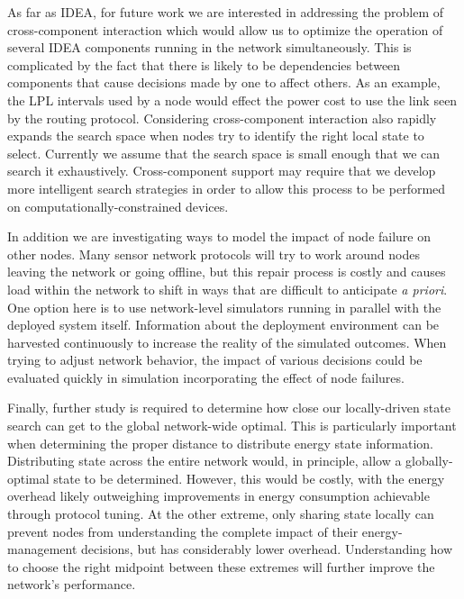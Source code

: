 As far as IDEA, for future work we are interested in addressing the problem
of cross-component interaction which would allow us to optimize the operation
of several IDEA components running in the network simultaneously. This is
complicated by the fact that there is likely to be dependencies between
components that cause decisions made by one to affect others. As an example,
the LPL intervals used by a node would effect the power cost to use the link
seen by the routing protocol. Considering cross-component interaction also
rapidly expands the search space when nodes try to identify the right local
state to select. Currently we assume that the search space is small enough
that we can search it exhaustively. Cross-component support may require that
we develop more intelligent search strategies in order to allow this process
to be performed on computationally-constrained devices.

In addition we are investigating ways to model the impact of node failure on
other nodes. Many sensor network protocols will try to work around nodes
leaving the network or going offline, but this repair process is costly and
causes load within the network to shift in ways that are difficult to
anticipate \textit{a priori}. One option here is to use network-level
simulators running in parallel with the deployed system itself. Information
about the deployment environment can be harvested continuously to increase
the reality of the simulated outcomes. When trying to adjust network
behavior, the impact of various decisions could be evaluated quickly in
simulation incorporating the effect of node failures.

Finally, further study is required to determine how close our locally-driven
state search can get to the global network-wide optimal. This is particularly
important when determining the proper distance to distribute energy state
information. Distributing state across the entire network would, in
principle, allow a globally-optimal state to be determined. However, this
would be costly, with the energy overhead likely outweighing improvements in
energy consumption achievable through protocol tuning. At the other extreme,
only sharing state locally can prevent nodes from understanding the complete
impact of their energy-management decisions, but has considerably lower
overhead. Understanding how to choose the right midpoint between these
extremes will further improve the network's performance.
